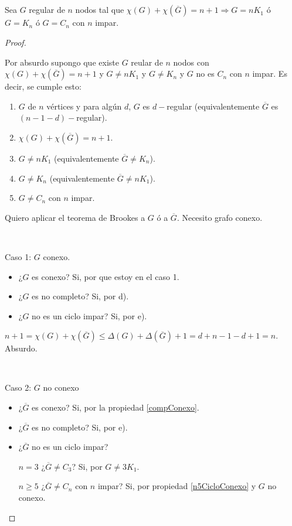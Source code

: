 \subsection{}
\begin{lema}
Sea $G$ regular de $n$ nodos tal que $\chi(G) + \chi(\overline{G}) = n + 1 \Longrightarrow G = n K_1$ ó $G = K_n$ ó $G = C_n$ con $n$ impar.
\end{lema}

\begin{proof}
	
	~

	Por absurdo supongo que existe $G$ reular de $n$ nodos con $\chi(G) + \chi(\overline{G}) = n + 1$ y $G \not= n K_1$ y $G \not= K_n$ y $G$ no es $C_n$ con $n$ impar. Es decir, se cumple esto:

	\begin{enumerate}[label=\alph*)]
		\item $G$ de $n$ vértices y para algún $d$, $G$ es $d-$regular (equivalentemente $\overline{G}$ es $(n - 1 - d)-$regular).
		\item $\chi(G) + \chi(\overline{G}) = n + 1$.
		\item $G \not= n K_1$ (equivalentemente $\overline{G} \not= K_n$).
		\item $G \not= K_n$ (equivalentemente $\overline{G} \not= n K_1$).
		\item $G \not= C_n$ con $n$ impar.
	\end{enumerate}

	Quiero aplicar el teorema de Brookes a $G$ ó a $\overline{G}$. Necesito grafo conexo.

	~

	Caso 1: $G$ conexo.

	\begin{itemize}
		\item ¿$G$ es conexo? Si, por que estoy en el caso 1.
		\item ¿$G$ es no completo? Si, por d).
		\item ¿$G$ no es un ciclo impar? Si, por e).
	\end{itemize}

	$n + 1 = \chi(G) + \chi(\overline{G}) \leq \Delta(G) + \Delta(\overline{G}) + 1 = d + n - 1 - d + 1 = n$. Absurdo.

	~

	Caso 2: $G$ no conexo

	\begin{itemize}
		\item ¿$\overline{G}$ es conexo? Si, por la propiedad \ref{compConexo}.
		\item ¿$\overline{G}$ es no completo? Si, por e).
		\item {
			¿$\overline{G}$ no es un ciclo impar?

			$n = 3$ ¿$\overline{G} \not= C_3$? Si, por $G \not= 3 K_1$.

			$n \geq 5$ ¿$\overline{G} \not= C_n$ con $n$ impar? Si, por propiedad \ref{n5CicloConexo} y $G$ no conexo.
		}
	\end{itemize}
\end{proof}